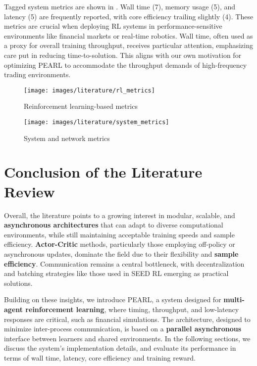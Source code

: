 Tagged system metrics are shown in .
Wall time (7), memory usage (5), and latency (5) are frequently reported, with core efficiency trailing slightly (4).
These metrics are crucial when deploying RL systems in performance-sensitive environments like financial markets or real-time robotics.
Wall time, often used as a proxy for overall training throughput, receives particular attention,
emphasizing care put in reducing time-to-solution.
This aligns with our own motivation for optimizing PEARL to accommodate the throughput demands of high-frequency trading environments.

\begin{figure}[htbp]
    \centering
    \begin{minipage}[t]{0.48\textwidth}
        \centering
        \texttt{[image: images/literature/rl\_metrics]}
        \caption{Reinforcement learning-based metrics}
        \label{fig:rl_metrics}
    \end{minipage}
    \hfill
    \begin{minipage}[t]{0.48\textwidth}
        \centering
        \texttt{[image: images/literature/system\_metrics]}
        \caption{System and network metrics}
        \label{fig:system_metrics}
    \end{minipage}
\end{figure}

\section{Conclusion of the Literature Review}
\label{sec:conclusion-of-the-literature-review}

Overall, the literature points to a growing interest in modular, scalable, and \textbf{asynchronous architectures} that can adapt to diverse computational environments,
while still maintaining acceptable training speeds and sample efficiency.
\textbf{Actor-Critic} methods, particularly those employing off-policy or asynchronous updates, dominate the field due to their flexibility and \textbf{sample efficiency}.
Communication remains a central bottleneck, with decentralization and batching strategies like those used in SEED RL emerging as practical solutions.

Building on these insights, we introduce PEARL, a system designed for \textbf{multi-agent reinforcement learning}, where
timing, throughput, and low-latency responses are critical, such as financial simulations.
The architecture, designed to minimize inter-process communication,
is based on a \textbf{parallel asynchronous} interface between learners and shared environments.
In the following sections, we discuss the system's implementation details,
and evaluate its performance in terms of wall time, latency, core efficiency and training reward.
